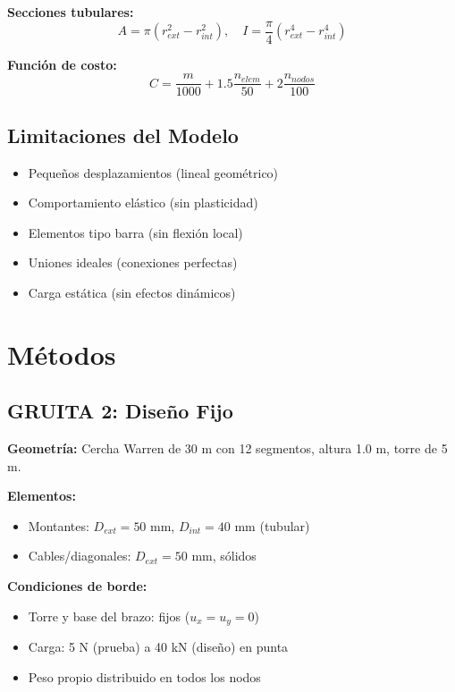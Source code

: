 \documentclass[10pt,a4paper]{article}
\begin{document}
\textbf{Secciones tubulares:}
\begin{equation}
A = \pi(r_{ext}^2 - r_{int}^2), \quad I = \frac{\pi}{4}(r_{ext}^4 - r_{int}^4)
\end{equation}

\textbf{Función de costo:}
\begin{equation}
C = \frac{m}{1000} + 1.5\frac{n_{elem}}{50} + 2\frac{n_{nodos}}{100}
\end{equation}

\subsection{Limitaciones del Modelo}

\begin{itemize}
\item Pequeños desplazamientos (lineal geométrico)
\item Comportamiento elástico (sin plasticidad)
\item Elementos tipo barra (sin flexión local)
\item Uniones ideales (conexiones perfectas)
\item Carga estática (sin efectos dinámicos)
\end{itemize}

\section{Métodos}

\subsection{GRUITA 2: Diseño Fijo}

\textbf{Geometría:} Cercha Warren de 30 m con 12 segmentos, altura 1.0 m, torre de 5 m.

\textbf{Elementos:}
\begin{itemize}
\item Montantes: $D_{ext}=50$ mm, $D_{int}=40$ mm (tubular)
\item Cables/diagonales: $D_{ext}=50$ mm, sólidos
\end{itemize}

\textbf{Condiciones de borde:}
\begin{itemize}
\item Torre y base del brazo: fijos ($u_x = u_y = 0$)
\item Carga: 5 N (prueba) a 40 kN (diseño) en punta
\item Peso propio distribuido en todos los nodos
\end{itemize}
\end{document}
